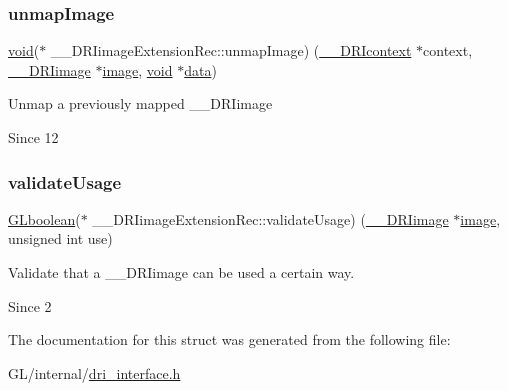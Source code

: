 \subsubsection{\texorpdfstring{unmap\+Image}{unmapImage}}
{\footnotesize\ttfamily \hyperlink{_s_d_l__opengles2__gl2ext_8h_ae5d8fa23ad07c48bb609509eae494c95}{void}($\ast$ \+\_\+\+\_\+\+D\+R\+Iimage\+Extension\+Rec\+::unmap\+Image) (\hyperlink{dri__interface_8h_a3fd295cba82b5a3d79f1ee7e12bfb908}{\+\_\+\+\_\+\+D\+R\+Icontext} $\ast$context, \hyperlink{dri__interface_8h_a37e0407153595dc88fe5d25127645cf1}{\+\_\+\+\_\+\+D\+R\+Iimage} $\ast$\hyperlink{gl_8h_a0a221b005894579fea3b9eb7bfc2ee71}{image}, \hyperlink{_s_d_l__opengles2__gl2ext_8h_ae5d8fa23ad07c48bb609509eae494c95}{void} $\ast$\hyperlink{gl_8h_a2e335d56e2846b0fea47eed068b2d34a}{data})}

Unmap a previously mapped \+\_\+\+\_\+\+D\+R\+Iimage

\begin{DoxySince}{Since}
12 
\end{DoxySince}
\mbox{\label{struct_____d_r_iimage_extension_rec_ac010719587d0c91d02627ae77a0fe6e1}} 
\subsubsection{\texorpdfstring{validate\+Usage}{validateUsage}}
{\footnotesize\ttfamily \hyperlink{gl_8h_aea1419aa8aec5854bd9807b45171029d}{G\+Lboolean}($\ast$ \+\_\+\+\_\+\+D\+R\+Iimage\+Extension\+Rec\+::validate\+Usage) (\hyperlink{dri__interface_8h_a37e0407153595dc88fe5d25127645cf1}{\+\_\+\+\_\+\+D\+R\+Iimage} $\ast$\hyperlink{gl_8h_a0a221b005894579fea3b9eb7bfc2ee71}{image}, unsigned int use)}

Validate that a \+\_\+\+\_\+\+D\+R\+Iimage can be used a certain way.

\begin{DoxySince}{Since}
2 
\end{DoxySince}


The documentation for this struct was generated from the following file\+:\begin{DoxyCompactItemize}
\item 
G\+L/internal/\hyperlink{dri__interface_8h}{dri\+\_\+interface.\+h}\end{DoxyCompactItemize}
